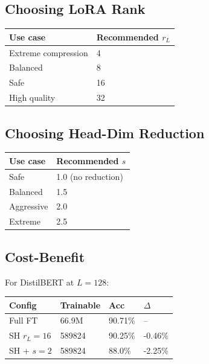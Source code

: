 \subsection{Choosing LoRA Rank}

\begin{table}[H]
\centering
\small
\begin{tabular}{ll}
\toprule
\textbf{Use case} & \textbf{Recommended $r_L$} \\
\midrule
Extreme compression & 4 \\
Balanced & 8 \\
Safe & 16 \\
High quality & 32 \\
\bottomrule
\end{tabular}
\end{table}

\subsection{Choosing Head-Dim Reduction}

\begin{table}[H]
\centering
\small
\begin{tabular}{ll}
\toprule
\textbf{Use case} & \textbf{Recommended $s$} \\
\midrule
Safe & 1.0 (no reduction) \\
Balanced & 1.5 \\
Aggressive & 2.0 \\
Extreme & 2.5 \\
\bottomrule
\end{tabular}
\end{table}

\subsection{Cost-Benefit}

For DistilBERT at $L = 128$:

\begin{table}[H]
\centering
\small
\begin{tabular}{llll}
\toprule
\textbf{Config} & \textbf{Trainable} & \textbf{Acc} & \textbf{$\Delta$} \\
\midrule
Full FT & 66.9M & 90.71\% & -- \\
SH $r_L=16$ & 589824 & 90.25\% & -0.46\% \\
SH + $s=2$ & 589824 & 88.0\% & -2.25\% \\
\bottomrule
\end{tabular}
\end{table}

